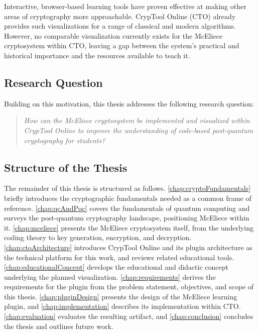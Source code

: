 Interactive, browser-based learning tools have proven effective at making other
areas of cryptography more approachable. CrypTool Online (CTO) already provides
such visualizations for a range of classical and modern algorithms. However, no
comparable visualization currently exists for the McEliece cryptosystem within CTO,
leaving a gap between the system's practical and historical importance and the
resources available to teach it.

\subsection{Research Question}
\label{sec:researchQuestion}

Building on this motivation, this thesis addresses the following research question:

\begin{quote}
	\itshape How can the McEliece cryptosystem be implemented and visualized within
	CrypTool Online to improve the understanding of code-based post-quantum
	cryptography for students?
\end{quote}

\subsection{Structure of the Thesis}
\label{sec:thesisStructure}

The remainder of this thesis is structured as follows. \autoref{chap:cryptoFundamentals}
briefly introduces the cryptographic fundamentals needed as a common frame of
reference. \autoref{chap:qcAndPqc} covers the fundamentals of quantum computing and
surveys the post-quantum cryptography landscape, positioning McEliece within it.
\autoref{chap:mceliece} presents the McEliece cryptosystem itself, from the
underlying coding theory to key generation, encryption, and decryption.
\autoref{chap:ctoArchitecture} introduces CrypTool Online and its plugin
architecture as the technical platform for this work, and reviews related
educational tools. \autoref{chap:educationalConcept} develops the educational and
didactic concept underlying the planned visualization.
\autoref{chap:requirements} derives the requirements for the plugin from the
problem statement, objectives, and scope of this thesis. \autoref{chap:pluginDesign}
presents the design of the McEliece learning plugin, and
\autoref{chap:implementation} describes its implementation within CTO.
\autoref{chap:evaluation} evaluates the resulting artifact, and
\autoref{chap:conclusion} concludes the thesis and outlines future work.
